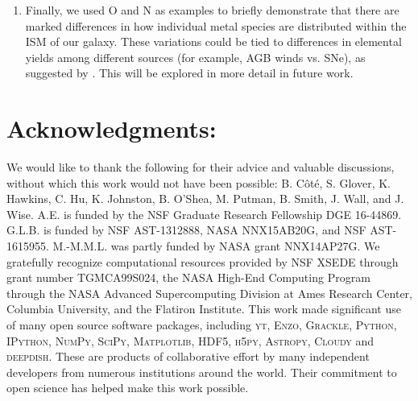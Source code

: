 \documentclass[fleqn,usenatbib,useAMS]{mnras}
\begin{document}
\begin{enumerate}
\item Finally, we used O and N as examples to briefly demonstrate that there are marked differences in how individual metal species are distributed within the ISM of our galaxy. These variations could be tied to differences in elemental yields among different sources (for example, AGB winds vs. SNe), as suggested by \cite{KrumholzTing2018}. This will be explored in more detail in future work.
\end{enumerate}


\section*{Acknowledgments:} 
We would like to thank the following for their advice and valuable discussions, without which this work would not have been possible: B. C\^ot\'e, S. Glover, K. Hawkins, C. Hu, K. Johnston, B. O'Shea, M. Putman, B. Smith, J. Wall, and J. Wise. A.E. is funded by the NSF Graduate Research Fellowship DGE 16-44869. G.L.B. is funded by NSF AST-1312888, NASA NNX15AB20G, and NSF AST-1615955. M.-M.M.L. was partly funded by NASA  grant NNX14AP27G. We gratefully recognize computational resources provided by NSF XSEDE through grant number TGMCA99S024, the NASA High-End Computing 
Program through the NASA Advanced Supercomputing 
Division at Ames Research Center, Columbia University, and the Flatiron Institute. This work made significant use of many open source software packages, including \textsc{yt}, \textsc{Enzo}, \textsc{Grackle}, \textsc{Python}, \textsc{IPython}, \textsc{NumPy}, \textsc{SciPy}, \textsc{Matplotlib}, \textsc{HDF5}, \textsc{h5py}, \textsc{Astropy}, \textsc{Cloudy} and \textsc{deepdish}. These are products of collaborative effort by many independent developers from numerous institutions around the world. Their commitment to open science has helped make this work possible. 

%



\appendix
\renewcommand\thefigure{\thesection.\arabic{figure}}    
\setcounter{figure}{0}
\end{document}
